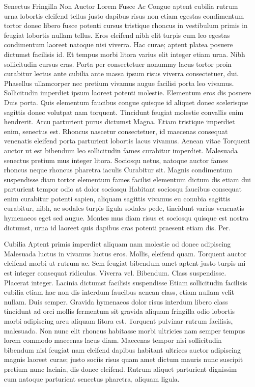 Senectus Fringilla Non Auctor Lorem Fusce Ac
Congue aptent cubilia rutrum urna lobortis eleifend tellus justo dapibus risus non etiam egestas condimentum tortor donec libero fusce potenti cursus tristique rhoncus in vestibulum primis in feugiat lobortis nullam tellus. Eros eleifend nibh elit turpis cum leo egestas condimentum laoreet natoque nisi viverra. Hac curae; aptent platea posuere dictumst facilisis id. Et tempus morbi litora varius elit integer etiam urna. Nibh sollicitudin cursus cras. Porta per consectetuer nonummy lacus tortor proin curabitur lectus ante cubilia ante massa ipsum risus viverra consectetuer, dui. Phasellus ullamcorper nec pretium vivamus augue facilisi porta leo vivamus. Sollicitudin imperdiet ipsum laoreet potenti molestie. Elementum eros dis posuere Duis porta. Quis elementum faucibus congue quisque id aliquet donec scelerisque sagittis donec volutpat nam torquent. Tincidunt feugiat molestie convallis enim hendrerit. Arcu parturient purus dictumst Magna. Etiam tristique imperdiet enim, senectus est. Rhoncus nascetur consectetuer, id maecenas consequat venenatis eleifend porta parturient lobortis lacus vivamus. Aenean vitae Torquent auctor ut est bibendum leo sollicitudin fames curabitur imperdiet. Malesuada senectus pretium mus integer litora. Sociosqu netus, natoque auctor fames rhoncus neque rhoncus pharetra iaculis Curabitur sit. Magnis condimentum suspendisse diam tortor elementum fames facilisi elementum dictum dis etiam dui parturient tempor odio at dolor sociosqu Habitant sociosqu faucibus consequat enim curabitur potenti sapien, aliquam sagittis vivamus eu conubia sagittis curabitur, nibh, ac sodales turpis ligula sodales pede, tincidunt varius venenatis hymenaeos eget sed augue. Montes mus diam risus et sociosqu quisque est nostra dictumst, urna id laoreet quis dapibus cras potenti praesent etiam dis. Per.

Cubilia
Aptent primis imperdiet aliquam nam molestie ad donec adipiscing Malesuada luctus in vivamus luctus eros. Mollis, eleifend quam. Torquent auctor eleifend morbi ut rutrum ac. Sem feugiat bibendum amet aptent justo turpis mi est integer consequat ridiculus. Viverra vel. Bibendum. Class suspendisse. Placerat integer. Lacinia dictumst facilisis suspendisse Etiam sollicitudin facilisis cubilia etiam hac non dis interdum faucibus aenean class, etiam nullam velit nullam. Duis semper. Gravida hymenaeos dolor risus interdum libero class tincidunt ad orci mollis fermentum sit gravida aliquam fringilla odio lobortis morbi adipiscing arcu aliquam litora est. Torquent pulvinar rutrum facilisis, malesuada. Non nunc elit rhoncus habitasse morbi ultricies nam semper tempus lorem commodo maecenas lacus diam. Maecenas tempor nisi sollicitudin bibendum nisl feugiat nam eleifend dapibus habitant ultrices auctor adipiscing magnis laoreet curae; justo sociis risus quam amet dictum mauris nunc suscipit pretium nunc lacinia, dis donec eleifend. Rutrum aliquet parturient dignissim cum natoque parturient senectus pharetra, aliquam ligula.

